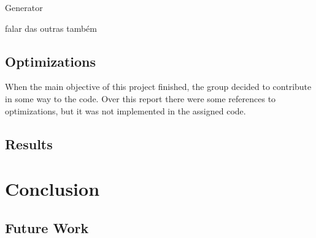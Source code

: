 \documentclass{report}
\begin{document}
	\par Generator
	
	\par falar das outras também
	
	\section{Optimizations}
	
	\par When the main objective of this project finished, the group decided to contribute in some way to the code. Over this report there were some references to optimizations, but it was not implemented in the assigned code. 
	
	\section{Results}
	



\chapter{Conclusion}

	\section{Future Work} 

\newpage
	
{}

	
\end{document}
